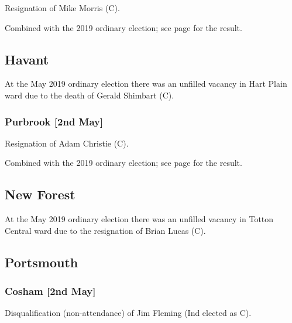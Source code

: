 \documentclass[a4paper,openany]{book}
\begin{document}
\begin{resultsiii}

Resignation of Mike Morris (C).

Combined with the 2019 ordinary election; see page \pageref{HartHook} for the result.

\subsection*{Havant}

At the May 2019 ordinary election there was an unfilled vacancy in Hart Plain ward due to the death of Gerald Shimbart (C).

\subsubsection*{Purbrook \hspace*{\fill}\nolinebreak[1]%
	\enspace\hspace*{\fill}
	[2nd May]}


Resignation of Adam Christie (C).

Combined with the 2019 ordinary election; see page \pageref{HavantPurbrook} for the result.

\subsection*{New Forest}

At the May 2019 ordinary election there was an unfilled vacancy in Totton Central ward due to the resignation of Brian Lucas (C).

\subsection*{Portsmouth}

\subsubsection*{Cosham \hspace*{\fill}\nolinebreak[1]%
	\enspace\hspace*{\fill}
	[2nd May]}


Disqualification (non-attendance) of Jim Fleming (Ind elected as C).


\end{resultsiii}
\end{document}
